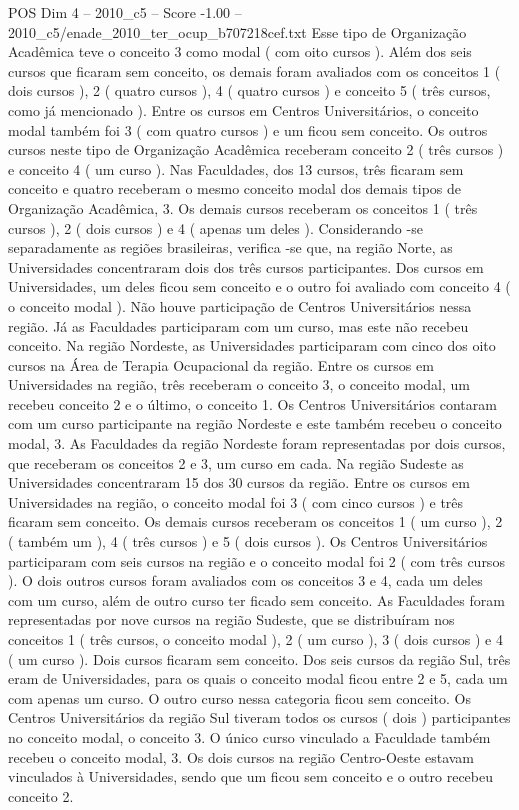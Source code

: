 \begin{textsample}{POS Dim 4 – 2010\_c5 – Score -1.00 – 2010\_c5/enade\_2010\_ter\_ocup\_b707218cef.txt}
Esse tipo de Organização Acadêmica teve o conceito 3 como modal ( com oito cursos ).
Além dos seis cursos que ficaram sem conceito, os demais foram avaliados com os conceitos 1 ( dois cursos ), 2 ( quatro cursos ), 4 ( quatro cursos ) e conceito 5 ( três cursos, como já mencionado ).
Entre os cursos em Centros Universitários, o conceito modal também foi 3 ( com quatro cursos ) e um ficou sem conceito.
Os outros cursos neste tipo de Organização Acadêmica receberam conceito 2 ( três cursos ) e conceito 4 ( um curso ).
Nas Faculdades, dos 13 cursos, três ficaram sem conceito e quatro receberam o mesmo conceito modal dos demais tipos de Organização Acadêmica, 3.
Os demais cursos receberam os conceitos 1 ( três cursos ), 2 ( dois cursos ) e 4 ( apenas um deles ).
Considerando -se separadamente as regiões brasileiras, verifica -se que, na região Norte, as Universidades concentraram dois dos três cursos participantes.
Dos cursos em Universidades, um deles ficou sem conceito e o outro foi avaliado com conceito 4 ( o conceito modal ).
Não houve participação de Centros Universitários nessa região.
Já as Faculdades participaram com um curso, mas este não recebeu conceito.
Na região Nordeste, as Universidades participaram com cinco dos oito cursos na Área de Terapia Ocupacional da região.
Entre os cursos em Universidades na região, três receberam o conceito 3, o conceito modal, um recebeu conceito 2 e o último, o conceito 1.
Os Centros Universitários contaram com um curso participante na região Nordeste e este também recebeu o conceito modal, 3.
As Faculdades da região Nordeste foram representadas por dois cursos, que receberam os conceitos 2 e 3, um curso em cada.
Na região Sudeste as Universidades concentraram 15 dos 30 cursos da região.
Entre os cursos em Universidades na região, o conceito modal foi 3 ( com cinco cursos ) e três ficaram sem conceito.
Os demais cursos receberam os conceitos 1 ( um curso ), 2 ( também um ), 4 ( três cursos ) e 5 ( dois cursos ).
Os Centros Universitários participaram com seis cursos na região e o conceito modal foi 2 ( com três cursos ).
O dois outros cursos foram avaliados com os conceitos 3 e 4, cada um deles com um curso, além de outro curso ter ficado sem conceito.
As Faculdades foram representadas por nove cursos na região Sudeste, que se distribuíram nos conceitos 1 ( três cursos, o conceito modal ), 2 ( um curso ), 3 ( dois cursos ) e 4 ( um curso ).
Dois cursos ficaram sem conceito.
Dos seis cursos da região Sul, três eram de Universidades, para os quais o conceito modal ficou entre 2 e 5, cada um com apenas um curso.
O outro curso nessa categoria ficou sem conceito.
Os Centros Universitários da região Sul tiveram todos os cursos ( dois ) participantes no conceito modal, o conceito 3.
O único curso vinculado a Faculdade também recebeu o conceito modal, 3.
Os dois cursos na região Centro-Oeste estavam vinculados à Universidades, sendo que um ficou sem conceito e o outro recebeu conceito 2.

\end{textsample}
